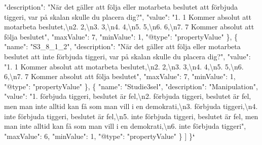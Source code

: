 \documentclass[
]{book}
\newenvironment{Shaded}{\begin{snugshade}}{\end{snugshade}}
\newcommand{\CharTok}[1]{\textcolor[rgb]{0.31,0.60,0.02}{#1}}
\newcommand{\DataTypeTok}[1]{\textcolor[rgb]{0.13,0.29,0.53}{#1}}
\newcommand{\DecValTok}[1]{\textcolor[rgb]{0.00,0.00,0.81}{#1}}
\newcommand{\ErrorTok}[1]{\textcolor[rgb]{0.64,0.00,0.00}{\textbf{#1}}}
\newcommand{\FunctionTok}[1]{\textcolor[rgb]{0.00,0.00,0.00}{#1}}
\newcommand{\OtherTok}[1]{\textcolor[rgb]{0.56,0.35,0.01}{#1}}
\newcommand{\StringTok}[1]{\textcolor[rgb]{0.31,0.60,0.02}{#1}}
\begin{document}
\begin{Shaded}
\begin{Highlighting}[]
      \DataTypeTok{"description"}\FunctionTok{:} \StringTok{"När det gäller att följa eller motarbeta beslutet att förbjuda tiggeri, var på skalan skulle du placera dig?"}\FunctionTok{,}
      \DataTypeTok{"value"}\FunctionTok{:} \StringTok{"1. 1 Kommer absolut att motarbeta beslutet,}\CharTok{\textbackslash{}n}\StringTok{2. 2,}\CharTok{\textbackslash{}n}\StringTok{3. 3,}\CharTok{\textbackslash{}n}\StringTok{4. 4,}\CharTok{\textbackslash{}n}\StringTok{5. 5,}\CharTok{\textbackslash{}n}\StringTok{6. 6,}\CharTok{\textbackslash{}n}\StringTok{7. 7 Kommer absolut att följa beslutet"}\FunctionTok{,}
      \DataTypeTok{"maxValue"}\FunctionTok{:} \DecValTok{7}\FunctionTok{,}
      \DataTypeTok{"minValue"}\FunctionTok{:} \DecValTok{1}\FunctionTok{,}
      \DataTypeTok{"@type"}\FunctionTok{:} \StringTok{"propertyValue"}
    \FunctionTok{\}}\OtherTok{,}
    \FunctionTok{\{}
      \DataTypeTok{"name"}\FunctionTok{:} \StringTok{"S3_8_1_2"}\FunctionTok{,}
      \DataTypeTok{"description"}\FunctionTok{:} \StringTok{"När det gäller att följa eller motarbeta beslutet att inte förbjuda tiggeri, var på skalan skulle du placera dig?"}\FunctionTok{,}
      \DataTypeTok{"value"}\FunctionTok{:} \StringTok{"1. 1 Kommer absolut att motarbeta beslutet,}\CharTok{\textbackslash{}n}\StringTok{2. 2,}\CharTok{\textbackslash{}n}\StringTok{3. 3,}\CharTok{\textbackslash{}n}\StringTok{4. 4,}\CharTok{\textbackslash{}n}\StringTok{5. 5,}\CharTok{\textbackslash{}n}\StringTok{6. 6,}\CharTok{\textbackslash{}n}\StringTok{7. 7 Kommer absolut att följa beslutet"}\FunctionTok{,}
      \DataTypeTok{"maxValue"}\FunctionTok{:} \DecValTok{7}\FunctionTok{,}
      \DataTypeTok{"minValue"}\FunctionTok{:} \DecValTok{1}\FunctionTok{,}
      \DataTypeTok{"@type"}\FunctionTok{:} \StringTok{"propertyValue"}
    \FunctionTok{\}}\OtherTok{,}
    \FunctionTok{\{}
      \DataTypeTok{"name"}\FunctionTok{:} \StringTok{"Studie3sel"}\FunctionTok{,}
      \DataTypeTok{"description"}\FunctionTok{:} \StringTok{"Manipulation"}\FunctionTok{,}
      \DataTypeTok{"value"}\FunctionTok{:} \StringTok{"1. förbjuda tiggeri, beslutet är fel,}\CharTok{\textbackslash{}n}\StringTok{2. förbjuda tiggeri, beslutet är fel, men man inte alltid kan få som man vill i en demokrati,}\CharTok{\textbackslash{}n}\StringTok{3. förbjuda tiggeri,}\CharTok{\textbackslash{}n}\StringTok{4. inte förbjuda tiggeri, beslutet är fel,}\CharTok{\textbackslash{}n}\StringTok{5. inte förbjuda tiggeri, beslutet är fel, men man inte alltid kan få som man vill i en demokrati,}\CharTok{\textbackslash{}n}\StringTok{6. inte förbjuda tiggeri"}\FunctionTok{,}
      \DataTypeTok{"maxValue"}\FunctionTok{:} \DecValTok{6}\FunctionTok{,}
      \DataTypeTok{"minValue"}\FunctionTok{:} \DecValTok{1}\FunctionTok{,}
      \DataTypeTok{"@type"}\FunctionTok{:} \StringTok{"propertyValue"}
    \FunctionTok{\}}
  \OtherTok{]}
\FunctionTok{\}}\ErrorTok{`}
\end{Highlighting}
\end{Shaded}
\end{document}

